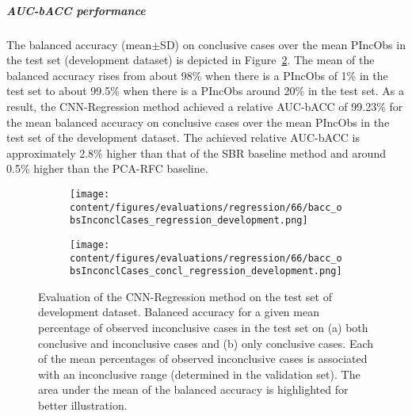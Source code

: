 \subparagraph{AUC-bACC performance}

The balanced accuracy (mean$\pm$SD) on conclusive cases over the mean PIncObs in the test set (development dataset) 
is depicted in Figure~\ref{fig:bacc_obsInconclCases_concl_regression_development}.
The mean of the balanced accuracy rises from about 98\% when there is a PIncObs of 1\% in the test set 
to about 99.5\% when there is a PIncObs around 20\% in the test set.
As a result, the CNN-Regression method achieved a relative AUC-bACC of 99.23\% for the mean balanced accuracy on conclusive cases
over the mean PIncObs in the test set of the development dataset.
The achieved relative AUC-bACC is approximately 2.8\% higher than that of the SBR baseline method 
and around 0.5\% higher than the PCA-RFC baseline.


\begin{figure}[ht]
  \begin{subfigure}{0.5\textwidth}
    \centering
    \texttt{[image: content/figures/evaluations/regression/66/bacc\_obsInconclCases\_regression\_development.png]}
    \subcaption{}
    \label{fig:bacc_obsInconclCases_regression_development}
  \end{subfigure}
  \hfill
  \begin{subfigure}{0.5\textwidth}
    \centering
    \texttt{[image: content/figures/evaluations/regression/66/bacc\_obsInconclCases\_concl\_regression\_development.png]}
    \subcaption{}
    \label{fig:bacc_obsInconclCases_concl_regression_development}
  \end{subfigure}

  \caption{Evaluation of the CNN-Regression method on the test set of development dataset.
  Balanced accuracy for a given mean percentage of observed inconclusive cases in the test set on 
  (a) both conclusive and inconclusive cases and (b) only conclusive cases. 
  Each of the mean percentages of observed inconclusive cases is associated with an inconclusive range (determined in the validation set). 
  The area under the mean of the balanced accuracy is highlighted for better illustration.}
  \label{fig:bacc_obsInconclCases_regression_development_full}
\end{figure}




